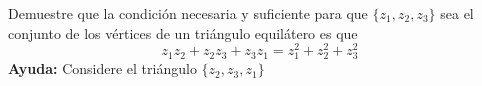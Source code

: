 \begin{problem}
Demuestre que la condición necesaria y suficiente para que $\{z_1, z_2, z_3\}$ sea el conjunto de los vértices de un triángulo equilátero es que
\[z_1z_2+z_2z_3+z_3z_1=z_1^2+z_2^2+z_3^2\]
\textbf{Ayuda:} Considere el triángulo $\{z_2, z_3,z_1\}$

\solution

\end{problem}


\newpage
